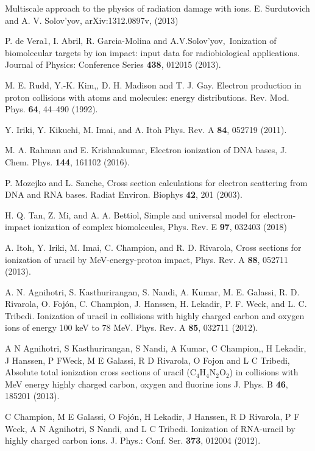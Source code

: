 \documentclass[10pt,showpacs,twocolumn]{revtex4}
\begin{document}
\begin{thebibliography}{}
Multiscale approach to the physics of radiation
damage with ions. E. Surdutovich and A. V. Solov'yov, 
arXiv:1312.0897v, (2013)

P. de Vera1, I. Abril, R. Garcia-Molina and
A.V.Solov'yov,\ Ionization of biomolecular targets by ion impact: input data
for radiobiological applications. 
Journal of Physics: Conference Series \textbf{438}, 012015 (2013).

M. E. Rudd, Y.-K. Kim,, D. H. Madison and T. J. Gay.
Electron production in proton collisions with atoms and molecules: energy
distributions. 
Rev. Mod. Phys. \textbf{64}, 44--490 (1992).

Y. Iriki, Y. Kikuchi, M. Imai, and A. Itoh
Phys. Rev. A \textbf{84}, 052719 (2011).

M. A. Rahman and E. Krishnakumar,
Electron ionization of DNA bases,
J. Chem. Phys. \textbf{144}, 161102 (2016).

P. Mozejko and L. Sanche, 
Cross section calculations for electron scattering from DNA and RNA bases.
Radiat Environ. Biophys \textbf{42}, 201 (2003).

H. Q. Tan, Z. Mi, and A. A. Bettiol, 
Simple and universal model for electron-impact ionization of complex 
biomolecules, 
Phys. Rev. E \textbf{97}, 032403 (2018)

A. Itoh, Y. Iriki, M. Imai, C. Champion, and R. D. Rivarola, 
Cross sections for ionization of uracil by MeV-energy-proton impact, 
Phys. Rev. A \textbf{88}, 052711 (2013).

A. N. Agnihotri, S. Kasthurirangan, S. Nandi, A.
Kumar, M. E. Galassi, R. D. Rivarola, O. Foj\'{o}n, C. Champion, J. Hanssen,
H. Lekadir, P. F. Weck, and L. C. Tribedi. 
Ionization of uracil in collisions with highly charged carbon and oxygen 
ions of energy 100 keV to 78 MeV. 
Phys. Rev. A \textbf{85}, 032711 (2012).

A N Agnihotri, S Kasthurirangan, S Nandi, A Kumar, C Champion,, H Lekadir, 
J Hanssen, P FWeck, M E Galassi, R D Rivarola, O Fojon and L C Tribedi, 
Absolute total ionization cross sections of uracil (C$_4$H$_4$N$_2$O$_2$) in 
collisions with MeV energy highly charged carbon, oxygen and fluorine ions
J. Phys. B \textbf{46}, 185201 (2013).

C Champion, M E Galassi, O Foj\'{o}n, H Lekadir, J Hanssen, R D Rivarola,
P F Weck, A N Agnihotri, S Nandi, and L C Tribedi. 
Ionization of RNA-uracil by highly charged carbon ions.
J. Phys.: Conf. Ser. \textbf{373}, 012004 (2012).


\end{thebibliography}
\end{document}
